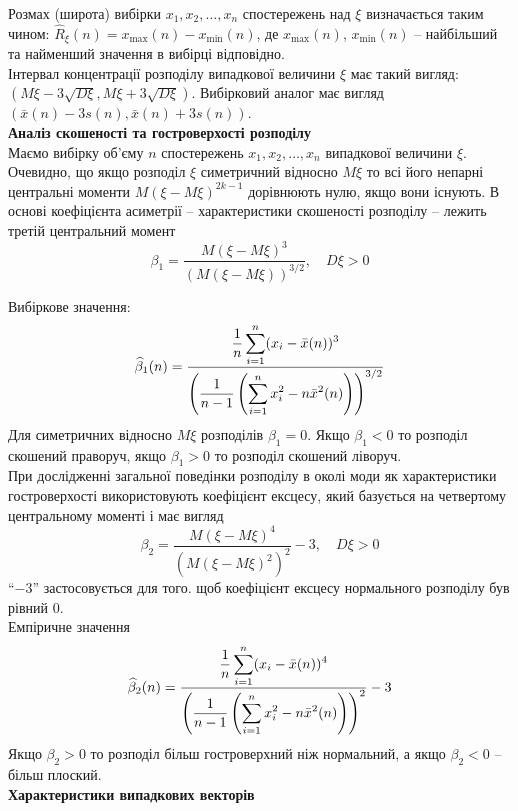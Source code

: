 Розмах (широта) вибірки $x_1, x_2, \ldots, x_n$ спостережень над $\xi$ визначається таким чином: $\widehat{R}_\xi(n) = x_{\max}(n) - x_{\min}(n)$, де $x_{\max}(n)$, $x_{\min}(n)$ -- найбільший та найменший значення в вибірці відповідно. \\

Інтервал концентрації розподілу випадкової величини $\xi$ має такий вигляд: $(M \xi - 3 \sqrt{D \xi}, M \xi + 3 \sqrt{D \xi})$. Вибірковий аналог має вигляд $(\bar{x}(n) - 3 s(n), \bar{x}(n) + 3 s(n))$. \\

\textbf{Аналіз скошеності та гостроверхості розподілу} \\

Маємо вибірку об'єму $n$ спостережень $x_1, x_2, \ldots, x_n$ випадкової величини $\xi$. \\

Очевидно, що якщо розподіл $\xi$ симетричний відносно $M \xi$ то всі його непарні центральні моменти $M(\xi - M \xi)^{2k-1}$ дорівнюють нулю, якщо вони існують. В основі коефіцієнта асиметрії -- характеристики скошеності розподілу -- лежить третій центральний момент \[ \beta_1 = \dfrac{M(\xi - M\xi)^3}{(M(\xi - M \xi))^{3/2}}, \quad D \xi > 0 \]

Вибіркове значення: \[ \widehat{\beta}_1(n) = \dfrac{\dfrac{1}{n} \displaystyle\sum\limits_{i=1}^n(x_i - \bar{x}(n))^3 }{\left( \dfrac{1}{n-1} \left( \displaystyle\sum\limits_{i=1}^n x_i^2 - n \bar{x}^2(n) \right) \right)^{3/2}} \]
Для симетричних відносно $M\xi$ розподілів $\beta_1 = 0$. Якщо $\beta_1 < 0$ то розподіл скошений праворуч, якщо $\beta_1 > 0$ то розподіл скошений ліворуч. \\

При дослідженні загальної поведінки розподілу в околі моди як характеристики гостроверхості використовують коефіцієнт ексцесу, який базується на четвертому центральному моменті і має вигляд
\[ \beta_2 = \dfrac{M (\xi - M \xi)^4}{(M (\xi - M \xi)^2)^2} - 3, \quad D \xi > 0 \]
``$-3$'' застосовується для того. щоб коефіцієнт ексцесу нормального розподілу був рівний 0. \\

Емпіричне значення 
\[ \widehat{\beta}_2(n) = \dfrac{\dfrac{1}{n} \displaystyle\sum\limits_{i=1}^n(x_i - \bar{x}(n))^4 }{\left( \dfrac{1}{n-1} \left( \displaystyle\sum\limits_{i=1}^n x_i^2 - n \bar{x}^2(n) \right) \right)^2} - 3 \]
Якщо $\beta_2 > 0$ то розподіл більш гостроверхний ніж нормальний, а якщо $\beta_2 < 0$ -- більш плоский. \\

\textbf{Характеристики випадкових векторів} \\

